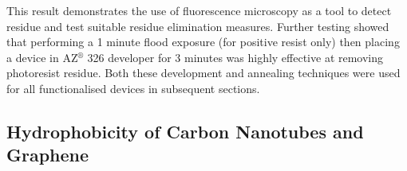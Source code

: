 \documentclass[
  a4paper,
]{scrbook}
\begin{document}
This result demonstrates the use of fluorescence microscopy as a tool to
detect residue and test suitable residue elimination measures. Further
testing showed that performing a 1 minute flood exposure (for positive
resist only) then placing a device in AZ\(^\circledR\) 326 developer for
3 minutes was highly effective at removing photoresist residue. Both
these development and annealing techniques were used for all
functionalised devices in subsequent sections.

\hypertarget{sec-hydrophobicity}{%
\subsection{Hydrophobicity of Carbon Nanotubes and
Graphene}\label{sec-hydrophobicity}}

\begin{figure}

\begin{minipage}[t]{0.03\linewidth}

{\centering 


}

\end{minipage}%
%
\begin{minipage}[t]{0.01\linewidth}

{\centering 

~

}

\end{minipage}%
%
\begin{minipage}[t]{0.45\linewidth}

{\centering 

\raisebox{-\height}{

}}
\end{minipage}
\end{figure}
\end{document}
